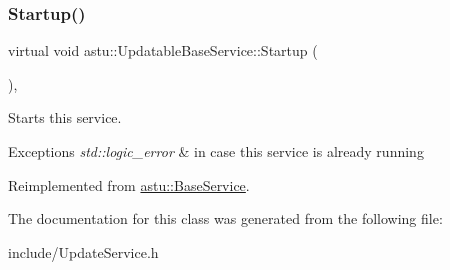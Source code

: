 \subsubsection{\texorpdfstring{Startup()}{Startup()}}
{\footnotesize\ttfamily virtual void astu\+::\+Updatable\+Base\+Service\+::\+Startup (\begin{DoxyParamCaption}{ }\end{DoxyParamCaption})\hspace{0.3cm}{\ttfamily [override]}, {\ttfamily [virtual]}}

Starts this service.


\begin{DoxyExceptions}{Exceptions}
{\em std\+::logic\+\_\+error} & in case this service is already running \\
\hline
\end{DoxyExceptions}


Reimplemented from \hyperlink{classastu_1_1BaseService_a59dade033dcb44dd32155c526a3a58e2}{astu\+::\+Base\+Service}.



The documentation for this class was generated from the following file\+:\begin{DoxyCompactItemize}
\item 
include/Update\+Service.\+h\end{DoxyCompactItemize}
